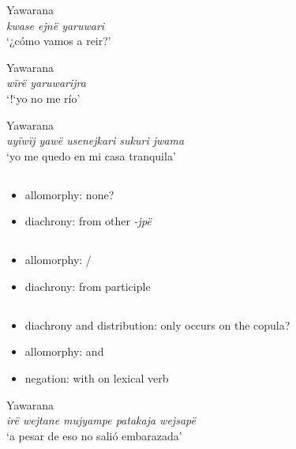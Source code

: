 \documentclass{memoir}
\begin{document}
\ex Yawarana \\
\label{convrisamaj-06}    \textit{kwase ejnë yaruwari }\\
        ‘¿cómo vamos a reir?’ \xe

\ex Yawarana \\
\label{convrisamaj-04}    \textit{wïrë yaruwarijra }\\
        ‘!‘yo no me río’ \xe

\ex Yawarana \\
\label{convrisamaj-28}    \textit{uyïwïj yawë usenejkari sukuri jwama }\\
        ‘yo me quedo en mi casa tranquila’ \xe

\subsection{\texorpdfstring{}{}}

\begin{itemize}
\tightlist
\item
  allomorphy: none?
\item
  diachrony: from other \emph{-jpë}
\end{itemize}

\subsection{\texorpdfstring{}{}}

\begin{itemize}
\tightlist
\item
  allomorphy: /
\item
  diachrony: from participle
\end{itemize}

\subsection{\texorpdfstring{}{}}

\begin{itemize}
\tightlist
\item
  diachrony and distribution: only occurs on the copula?
\item
  allomorphy:  and 
\item
  negation: with  on lexical verb
\end{itemize}

\ex Yawarana \\
\label{ctoaragrme-38}    \textit{irë wejtane mujyampe patakaja wejsapë }\\
        ‘a pesar de eso no salió embarazada’ \xe
\end{document}
